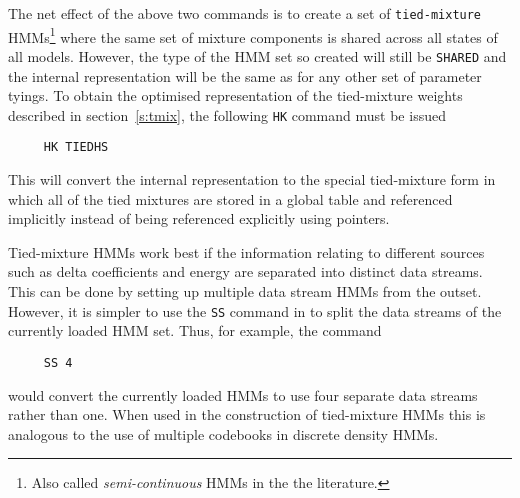 The net effect of the above two commands is to create a set of \texttt{tied-mixture}
HMMs\footnote{Also called {\it semi-continuous} HMMs in the the literature.}
where the same set of mixture components is shared across all states of
all models.  However, the type of the HMM set so created will still be
\texttt{SHARED} and the internal representation will be the same as for
any other set of parameter tyings.   To obtain the optimised representation 
of the tied-mixture weights
described in section~\ref{s:tmix}, the following 
\texttt{HK} command must be issued
\begin{verbatim}
     HK TIEDHS
\end{verbatim}
This will convert the internal representation to the special tied-mixture
form in which all of the tied mixtures are stored in a global table and
referenced implicitly instead
of being referenced explicitly using pointers.

Tied-mixture HMMs work best if the information relating to different sources
such as delta coefficients and energy are separated into distinct data streams.
This can be done by setting up multiple data stream HMMs from the outset.  
However, it is simpler to use the 
\texttt{SS}
command in  to split the data streams of the currently loaded HMM set.
Thus, for example, the command
\begin{verbatim}
     SS 4 
\end{verbatim}
would convert the currently loaded HMMs to use four separate data streams
rather than one.  When used in the construction of tied-mixture HMMs
this is analogous to the use of multiple codebooks in discrete density 
HMMs.

